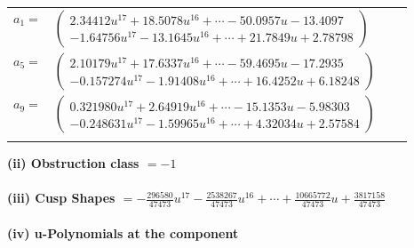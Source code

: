 \documentclass[1p]{elsarticle_modified}
\theoremstyle{definition}
\begin{document}
\begin{tabular}{m{7pt} m{180pt} m{7pt} m{180pt} }
\flushright $a_{1}=$&$\begin{pmatrix}2.34412 u^{17}+18.5078 u^{16}+\cdots-50.0957 u-13.4097\\-1.64756 u^{17}-13.1645 u^{16}+\cdots+21.7849 u+2.78798\end{pmatrix}$ \\
\flushright $a_{5}=$&$\begin{pmatrix}2.10179 u^{17}+17.6337 u^{16}+\cdots-59.4695 u-17.2935\\-0.157274 u^{17}-1.91408 u^{16}+\cdots+16.4252 u+6.18248\end{pmatrix}$ \\
\flushright $a_{9}=$&$\begin{pmatrix}0.321980 u^{17}+2.64919 u^{16}+\cdots-15.1353 u-5.98303\\-0.248631 u^{17}-1.59965 u^{16}+\cdots+4.32034 u+2.57584\end{pmatrix}$\\&\end{tabular}
\flushleft \textbf{(ii) Obstruction class $= -1$}\\~\\
\flushleft \textbf{(iii) Cusp Shapes $= -\frac{296580}{47473} u^{17}-\frac{2538267}{47473} u^{16}+\cdots+\frac{10665772}{47473} u+\frac{3817158}{47473}$}\\~\\
\newpage\renewcommand{\arraystretch}{1}
\flushleft \textbf{(iv) u-Polynomials at the component}\newline \\
\end{document}
